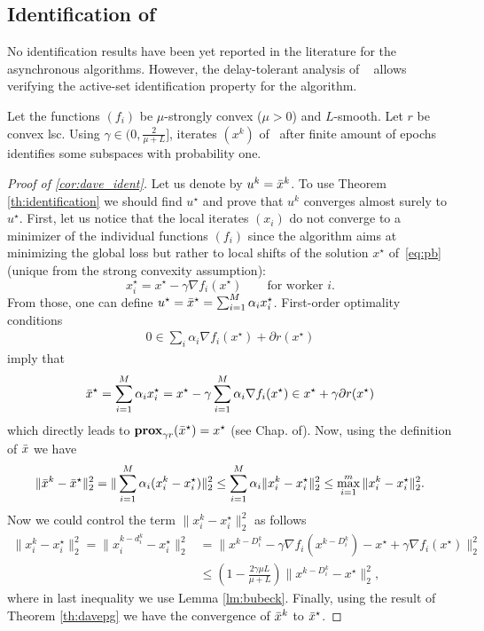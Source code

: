 {
\subsection{Identification of \dave}\label{sec:dave_ident}
No identification results have been yet reported in the literature for the asynchronous algorithms. However, the delay-tolerant analysis of \dave~\cite{ICML18} allows verifying the active-set identification property for the algorithm.
\begin{corollary}\label{cor:dave_ident}
Let the functions $(f_i)$ be $\mu$-strongly convex ($\mu>0$) and $L$-smooth. Let $r$ be convex lsc. Using $\gamma \in (0, \frac{2}{\mu + L}]$, iterates $(x^k)$ of \dave~after finite amount of epochs identifies some subspaces with probability one.
\end{corollary}
\begin{proof}[Proof of \ref{cor:dave_ident}]
Let us denote by $u^k = \bar{x}^k$. To use Theorem \ref{th:identification} we should find $u^\star$ and prove that $u^k$ converges almost surely to $u^\star$.
First, let us notice that the local iterates $(x_i)$ do not converge to a minimizer of the individual functions $(f_i)$ since the algorithm aims at minimizing the global loss but rather to local shifts of the solution $x^\star$ of~\eqref{eq:pb} (unique from the strong convexity assumption):
\[
x_i^\star = x^\star - \gamma \nabla f_i(x^\star) \qquad \text{for worker $i$}.
\]
From those, one can define $u^\star = \bar{x}^\star = \sum_{i=1}^M \alpha_i x_i^\star$. First-order optimality conditions 
\begin{align*}
    0\in \sum_i \alpha_i \nabla f_i(x^\star) + \partial r(x^\star)
\end{align*}
imply that 
\[
\bar{x}^\star = \sum_{i=1}^M \alpha_i x_i^\star = x^\star - \gamma \sum_{i=1}^M \alpha_i \nabla f_i(x^\star) \in x^\star  + \gamma \partial r(x^\star)
\]
which directly leads to $\mathbf{prox}_{\gamma r}(\bar{x}^\star) = x^\star$ (see Chap. of\;\cite{bauschke2011convex}).
Now, using the definition of $\bar{x}$ we have
\begin{align*}
    \|\bar{x}^k - \bar{x}^\star\|_2^2 = \|\sum_{i=1}^M\alpha_i(x_i^k -x_i^\star)\|_2^2\leq\sum_{i=1}^M\alpha_i\|x_i^k-x_i^\star\|_2^2\leq\max_{i=1}^m\|x_i^k-x_i^\star\|_2^2.
\end{align*}
Now we could control the term $\|x_i^k-x_i^\star\|_2^2$ as follows
\begin{align*}
    \|x_i^k-x_i^\star\|_2^2= \|x_i^{k-d_i^k}-x_i^\star\|_2^2 & = \|x^{k-D_i^k}-\gamma\nabla f_i(x^{k-D_i^k}) - x^\star + \gamma\nabla f_i(x^\star)\|_2^2 \\
    &\leq \left(1 - \frac{2\gamma\mu L}{\mu + L}\right)\|x^{k-D_i^k} - x^\star\|_2^2,
\end{align*}
where in  last inequality we use Lemma \ref{lm:bubeck}.
Finally, using the result of Theorem \ref{th:davepg} we have the convergence of $\bar{x}^k$ to $\bar{x}^\star$.
\end{proof}
}